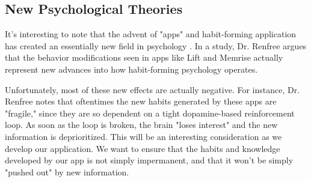 \subsection{New Psychological Theories}
It's interesting to note that the advent of "apps" and habit-forming application has created an essentially new field in psychology \cite{renfree2016don}. In a study, Dr. Renfree argues that the behavior modifications seen in apps like Lift and Memrise actually represent new advances into how habit-forming psychology operates.

Unfortunately, most of these new effects are actually negative. For instance, Dr. Renfree notes that oftentimes the new habits generated by these apps are "fragile," since they are so dependent on a tight dopamine-based reinforcement loop. As soon as the loop is broken, the brain "loses interest" and the new 
information is deprioritized. This will be an interesting consideration as we develop our application. We want to ensure that the habits and knowledge developed by our app is not simply impermanent, and that it won't be simply "pushed out" by new information.